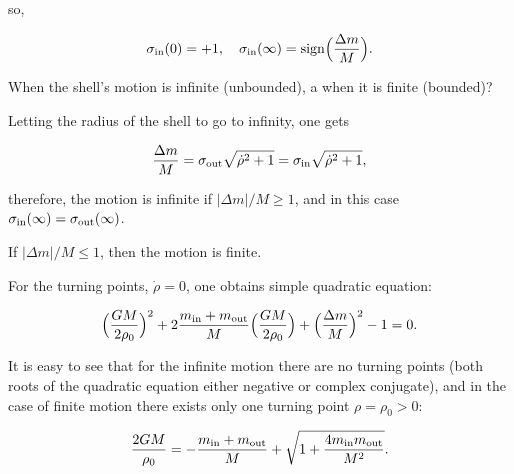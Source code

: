 so,

\begin{gather}

\label{s0infin}

\sigma_{\rm in}(0) = + 1 ,\quad 

\sigma_{\rm in}(\infty) = \mathop{\rm sign} \Bigl(\frac{\Delta m}{M} \Bigr)  .

\end{gather}



When the shell's motion is infinite (unbounded), a when it is finite (bounded)?  

Letting the radius of the shell to go to infinity, one gets

\begin{equation}

\label{infmot}

\frac{\Delta m}{M} = \sigma_{\rm out} \sqrt{\dot \rho^2 + 1} = \sigma_{\rm in} \sqrt{\dot \rho^2 + 1} ,

\end{equation}

therefore, the motion is infinite if $| {\Delta m}|/ {M}\ge 1 $, and in this case $\sigma_{\rm in}(\infty) = \sigma_{\rm out}(\infty)$. 

If $| {\Delta m}|/{M}  \le 1 $, then the motion is finite.



For the turning points, $\dot \rho = 0$, one obtains simple quadratic equation:

\begin{equation}

\label{turn}

\Bigl( \frac{G M}{2 \rho_0} \Bigr)^2 + 2 \frac{m_{\rm in} + m_{\rm out}}{M} \Bigl( \frac{G M}{2 \rho_0} \Bigr) + \Bigl( \frac{\Delta m}{M} \Bigr)^2 - 1 = 0 .

\end{equation}

It is easy to see that for the infinite motion there are no turning points (both roots of the quadratic equation either negative or complex conjugate), and in the case of finite motion there exists only one turning point $\rho = \rho_0 > 0$:

\begin{equation}

\label{turnroot}

\frac{2 G M}{\rho_0} = - \frac{m_{\rm in} + m_{\rm out}}{M} + \sqrt{1 + \frac{4 m_{\rm in} m_{\rm out}}{M^2}}.

\end{equation}



